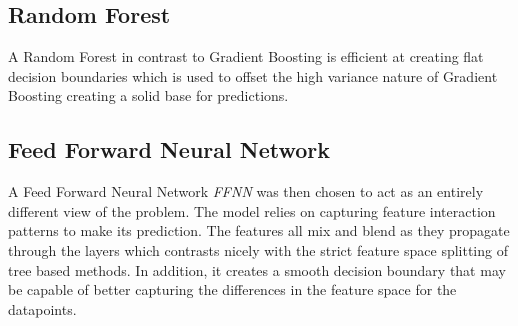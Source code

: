 \subsection{Random Forest}
A Random Forest in contrast to Gradient Boosting is efficient at creating flat decision boundaries which is used to offset the high variance nature of Gradient Boosting creating a solid base for predictions.

\subsection{Feed Forward Neural Network}
A Feed Forward Neural Network \textit{FFNN} was then chosen to act as an entirely different view of the problem. The model relies on capturing feature interaction patterns to make its prediction. The features all mix and blend as they propagate through the layers which contrasts nicely with the strict feature space splitting of tree based methods. In addition, it creates a smooth decision boundary that may be capable of better capturing the differences in the feature space for the datapoints.